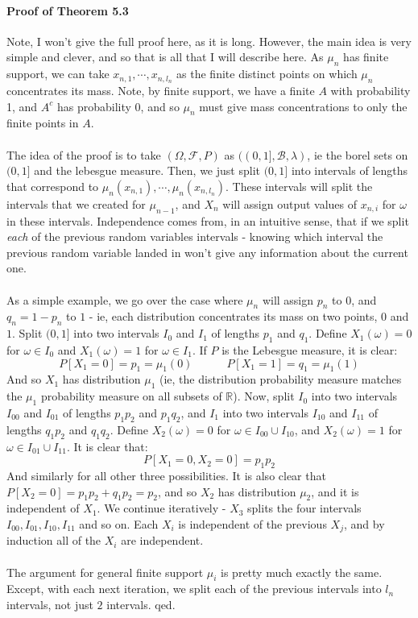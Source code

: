 \documentclass[12pt,a4paper]{article}
\newcommand{\1}[1]{\mathbbm{1}\left\{ #1 \right\}}
\newcommand{\R}{\mathbb{R}}
\newcommand{\fcal}{\mathcal{F}}
\newcommand{\bcal}{\mathcal{B}}
\begin{document}
\paragraph{Proof of Theorem 5.3} Note, I won't give the full proof here, as it is long. However, the main idea is very simple and clever, and so that is all that I will describe here. As $\mu_n$ has finite support, we can take $x_{n,1}, \cdots, x_{n,l_n}$ as the finite distinct points on which $\mu_n$ concentrates its mass. Note, by finite support, we have a finite $A$ with probability 1, and $A^c$ has probability $0$, and so $\mu_n$ must give mass concentrations to only the finite points in $A$.
\\\\
The idea of the proof is to take $(\Omega,\fcal,P)$ as $((0,1],\bcal,\lambda)$, ie the borel sets on $(0,1]$ and the lebesgue measure. Then, we just split $(0,1]$ into intervals of lengths that correspond to $\mu_n(x_{n,1}), \cdots, \mu_n(x_{n,l_n})$. These intervals will split the intervals that we created for $\mu_{n-1}$, and $X_n$ will assign output values of $x_{n,i}$ for $\omega$ in these intervals. Independence comes from, in an intuitive sense, that if we split \textit{each} of the previous random variables intervals - knowing which interval the previous random variable landed in won't give any information about the current one.
\\\\
As a simple example, we go over the case where $\mu_n$ will assign $p_n$ to $0$, and $q_n = 1 - p_n$ to $1$ - ie, each distribution concentrates its mass on two points, $0$ and $1$. Split $(0,1]$ into two intervals $I_0$ and $I_1$ of lengths $p_1$ and $q_1$. Define $X_1(\omega) = 0$ for $\omega \in I_0$ and $X_1(\omega) = 1$ for $\omega \in I_1$. If $P$ is the Lebesgue measure, it is clear:
$$
	P[X_1 = 0] = p_1 = \mu_1(0) \quad\quad\quad P[X_1 = 1] = q_1 = \mu_1(1)
$$
And so $X_1$ has distribution $\mu_1$ (ie, the distribution probability measure matches the $\mu_1$ probability measure on all subsets of $\R$). Now, split $I_0$ into two intervals $I_{00}$ and $I_{01}$ of lengths $p_1p_2$ and $p_1q_2$, and $I_1$ into two intervals $I_{10}$ and $I_{11}$ of lengths $q_1p_2$ and $q_1q_2$. Define $X_2(\omega) = 0$ for $\omega \in I_{00} \cup I_{10}$, and $X_2(\omega) = 1$ for $\omega \in I_{01} \cup I_{11}$. It is clear that:
$$
	P[X_1 = 0, X_2 = 0] = p_1p_2
$$
And similarly for all other three possibilities. It is also clear that $P[X_2 = 0] = p_1p_2 + q_1p_2 = p_2$, and so $X_2$ has distribution $\mu_2$, and it is independent of $X_1$. We continue iteratively - $X_3$ splits the four intervals $I_{00},I_{01},I_{10},I_{11}$ and so on. Each $X_i$ is independent of the previous $X_j$, and by induction all of the $X_i$ are independent.
\\\\
The argument for general finite support $\mu_i$ is pretty much exactly the same. Except, with each next iteration, we split each of the previous intervals into $l_n$ intervals, not just $2$ intervals. qed.
\end{document}
